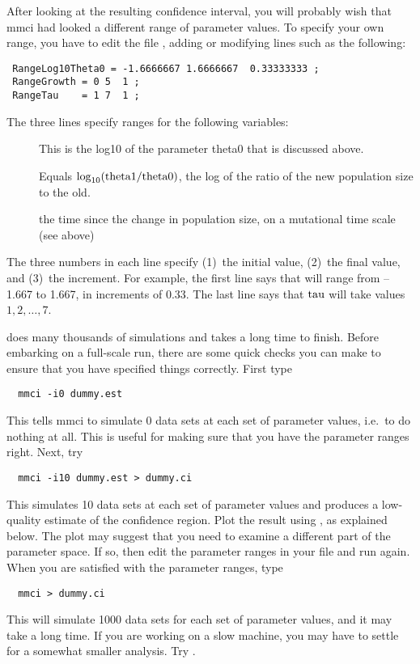 After looking at the resulting confidence interval, you will probably
wish that mmci had looked a different range of parameter values.  To
specify your own range, you have to edit the file , adding
or modifying lines such as the following:
\begin{verbatim}
 RangeLog10Theta0 = -1.6666667 1.6666667  0.33333333 ;
 RangeGrowth = 0 5  1 ;
 RangeTau    = 1 7  1 ;
\end{verbatim}
The three lines specify ranges for the following variables:
\begin{description}
\item[] This is the log10 of the parameter theta0 that is
                 discussed above.

\item[] Equals $\log_{10}(\hbox{theta1}/\hbox{theta0})$, the log of the
      ratio of the new population size to the old.

\item[] the time since the change in population size, on a
      mutational time scale (see above) 
\end{description}
The three numbers in each line specify (1)~the initial value, (2)~the
final value, and (3)~the increment.  For example, the first line says
that  will range from --1.667 to 1.667, in increments
of 0.33.  The last line says that $\hbox{tau}$ will take values
$1,2,\ldots,7$.

 does many thousands of simulations and takes a long time to
finish.  Before embarking on a full-scale run, there are some quick
checks you can make to ensure that you have specified things
correctly.   First type
\begin{verbatim}
  mmci -i0 dummy.est 
\end{verbatim}
This tells mmci to simulate 0 data sets at each set of parameter
values, i.e.\ to do nothing at all.  This is useful for making sure
that you have the parameter ranges right.  Next, try
\begin{verbatim}
  mmci -i10 dummy.est > dummy.ci
\end{verbatim}
This simulates 10 data sets at each set of parameter values and
produces a low-quality estimate of the confidence region.  Plot the
result using , as explained below.  The plot may suggest
that you need to examine a different part of the parameter space.  If
so, then edit the parameter ranges in your  file and run
 again.  When you are satisfied with the parameter ranges, type
\begin{verbatim}
  mmci > dummy.ci
\end{verbatim}
This will simulate 1000 data sets for each set of parameter values,
and it may take a long time.  If you are working on a slow machine,
you may have to settle for a somewhat smaller analysis.  Try
. 

